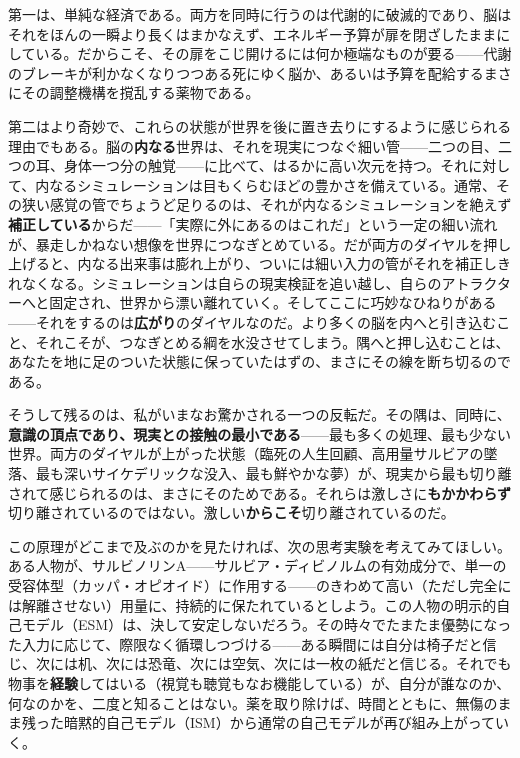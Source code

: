 \documentclass[11pt, twoside, openright]{book}
\begin{document}
第一は、単純な経済である。両方を同時に行うのは代謝的に破滅的であり、脳はそれをほんの一瞬より長くはまかなえず、エネルギー予算が扉を閉ざしたままにしている。だからこそ、その扉をこじ開けるには何か極端なものが要る------代謝のブレーキが利かなくなりつつある死にゆく脳か、あるいは予算を配給するまさにその調整機構を撹乱する薬物である。

第二はより奇妙で、これらの状態が世界を後に置き去りにするように感じられる理由でもある。脳の\textbf{内なる}世界は、それを現実につなぐ細い管------二つの目、二つの耳、身体一つ分の触覚------に比べて、はるかに高い次元を持つ。それに対して、内なるシミュレーションは目もくらむほどの豊かさを備えている。通常、その狭い感覚の管でちょうど足りるのは、それが内なるシミュレーションを絶えず\textbf{補正している}からだ------「実際に外にあるのはこれだ」という一定の細い流れが、暴走しかねない想像を世界につなぎとめている。だが両方のダイヤルを押し上げると、内なる出来事は膨れ上がり、ついには細い入力の管がそれを補正しきれなくなる。シミュレーションは自らの現実検証を追い越し、自らのアトラクターへと固定され、世界から漂い離れていく。そしてここに巧妙なひねりがある------それをするのは\textbf{広がり}のダイヤルなのだ。より多くの脳を内へと引き込むこと、それこそが、つなぎとめる綱を水没させてしまう。隅へと押し込むことは、あなたを地に足のついた状態に保っていたはずの、まさにその線を断ち切るのである。

そうして残るのは、私がいまなお驚かされる一つの反転だ。その隅は、同時に、\textbf{意識の頂点であり、現実との接触の最小である}------最も多くの処理、最も少ない世界。両方のダイヤルが上がった状態（臨死の人生回顧、高用量サルビアの墜落、最も深いサイケデリックな没入、最も鮮やかな夢）が、現実から最も切り離されて感じられるのは、まさにそのためである。それらは激しさに\textbf{もかかわらず}切り離されているのではない。激しい\textbf{からこそ}切り離されているのだ。

この原理がどこまで及ぶのかを見たければ、次の思考実験を考えてみてほしい。ある人物が、サルビノリンA------サルビア・ディビノルムの有効成分で、単一の受容体型（カッパ・オピオイド）に作用する------のきわめて高い（ただし完全には解離させない）用量に、持続的に保たれているとしよう。この人物の明示的自己モデル（ESM）は、決して安定しないだろう。その時々でたまたま優勢になった入力に応じて、際限なく循環しつづける------ある瞬間には自分は椅子だと信じ、次には机、次には恐竜、次には空気、次には一枚の紙だと信じる。それでも物事を\textbf{経験}してはいる（視覚も聴覚もなお機能している）が、自分が誰なのか、何なのかを、二度と知ることはない。薬を取り除けば、時間とともに、無傷のまま残った暗黙的自己モデル（ISM）から通常の自己モデルが再び組み上がっていく。
\end{document}
